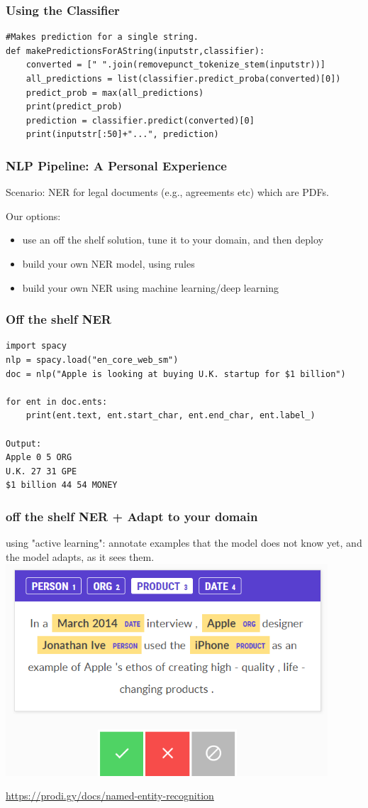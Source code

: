 \documentclass{beamer}
\begin{document}
\begin{frame}[fragile]
\frametitle{Using the Classifier}
\tiny
\begin{verbatim}
#Makes prediction for a single string.
def makePredictionsForAString(inputstr,classifier):
    converted = [" ".join(removepunct_tokenize_stem(inputstr))]
    all_predictions = list(classifier.predict_proba(converted)[0])
    predict_prob = max(all_predictions)
    print(predict_prob)
    prediction = classifier.predict(converted)[0]
    print(inputstr[:50]+"...", prediction)

\end{verbatim}
\end{frame}

\begin{frame}
\frametitle{NLP Pipeline: A Personal Experience}
Scenario: NER for legal documents (e.g., agreements etc) which are PDFs. \pause

Our options:
\begin{itemize}
\item use an off the shelf solution, tune it to your domain, and then deploy \pause
\item build your own NER model, using rules \pause
\item build your own NER using machine learning/deep learning
\end{itemize}
\end{frame}

\begin{frame}[fragile]
    \frametitle{Off the shelf NER}
\tiny
\begin{verbatim}
import spacy
nlp = spacy.load("en_core_web_sm")
doc = nlp("Apple is looking at buying U.K. startup for $1 billion")

for ent in doc.ents:
    print(ent.text, ent.start_char, ent.end_char, ent.label_)
    
Output: 
Apple 0 5 ORG
U.K. 27 31 GPE
$1 billion 44 54 MONEY
\end{verbatim}
\end{frame}

\begin{frame}
\frametitle{off the shelf NER + Adapt to your domain}
using "active learning": annotate examples that the model does not know yet, and the model adapts, as it sees them.
\includegraphics[width=0.9\textwidth]{figures/prodigy.png}

\tiny \url{https://prodi.gy/docs/named-entity-recognition}
\end{frame}
\end{document}
